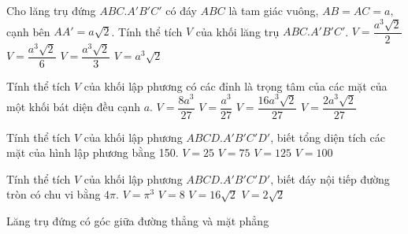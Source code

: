 \begin{ex}%
	Cho lăng trụ đứng $ABC.A'B'C'$ có đáy $ABC$ là tam giác vuông, $AB=AC=a,$ cạnh bên $AA'=a\sqrt{2}$. Tính thể tích $V$ của khối lăng trụ $ABC.A'B'C'$. 
	\choice
	{\True $V=\dfrac{a^3\sqrt{2}}{2}$}
	{$V=\dfrac{a^3\sqrt{2}}{6}$}
	{$V=\dfrac{a^3\sqrt{2}}{3}$}
	{$V=a^3\sqrt{2}$}
\end{ex}


\begin{ex}%
	Tính thể tích $V$ của khối lập phương có các đỉnh là trọng tâm của các mặt của một khối bát diện đều cạnh $a$. 
	\choice
	{\True $V=\dfrac{8a^3}{27}$}
	{$V=\dfrac{a^3}{27}$}
	{$V=\dfrac{16a^3\sqrt{2}}{27}$}
	{$V=\dfrac{2a^3\sqrt{2}}{27}$}
\end{ex}


\begin{ex}%
	Tính thể tích $V$ của khối lập phương $ABCD.A'B'C'D'$, biết tổng diện tích các mặt của hình lập phương bằng 150. 
	\choice
	{$V=25$}
	{$V=75$}
	{\True $V=125$}
	{$V=100$}
\end{ex}

\begin{ex}%
	Tính thể tích $V$ của khối lập phương $ABCD.A'B'C'D'$, biết đáy nội tiếp đường tròn có chu vi bằng $4\pi$. 
	\choice
	{$V=\pi^3$}
	{\True $V=8$}
	{$V=16\sqrt{2}$}
	{$V=2\sqrt{2}$}
\end{ex}

\begin{dang}{Lăng trụ đứng có góc giữa đường thẳng và mặt phẳng}
\end{dang}
